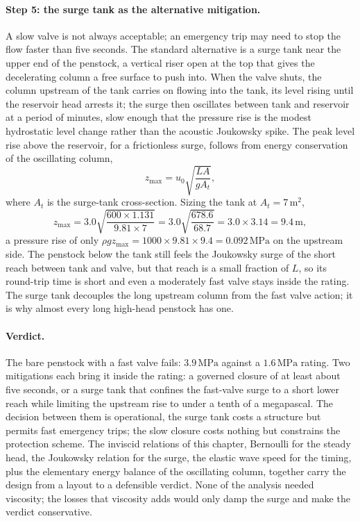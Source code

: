 \paragraph{Step 5: the surge tank as the alternative mitigation.} A
slow valve is not always acceptable; an emergency trip may need to
stop the flow faster than five seconds. The standard alternative is a
surge tank near the upper end of the penstock, a vertical riser open
at the top that gives the decelerating column a free surface to push
into. When the valve shuts, the column upstream of the tank carries
on flowing into the tank, its level rising until the reservoir head
arrests it; the surge then oscillates between tank and reservoir at a
period of minutes, slow enough that the pressure rise is the modest
hydrostatic level change rather than the acoustic Joukowsky spike. The
peak level rise above the reservoir, for a frictionless surge,
follows from energy conservation of the oscillating column,
\[
z_\text{max} = u_0 \sqrt{\frac{L A}{g A_t}},
\]
where $A_t$ is the surge-tank cross-section. Sizing the tank at
$A_t = 7\,\si{\meter}^2$,
\[
z_\text{max} = 3.0\sqrt{\frac{600\times 1.131}{9.81\times 7}}
= 3.0\sqrt{\frac{678.6}{68.7}} = 3.0\times 3.14
= 9.4\,\si{\meter},
\]
a pressure rise of only $\rho g z_\text{max} = 1000\times 9.81\times
9.4 = 0.092\,\text{MPa}$ on the upstream side. The penstock below the
tank still feels the Joukowsky surge of the short reach between tank
and valve, but that reach is a small fraction of $L$, so its
round-trip time is short and even a moderately fast valve stays inside
the rating. The surge tank decouples the long upstream column from the
fast valve action; it is why almost every long high-head penstock has
one.

\paragraph{Verdict.} The bare penstock with a fast valve fails:
$3.9\,\text{MPa}$ against a $1.6\,\text{MPa}$ rating. Two mitigations
each bring it inside the rating: a governed closure of at least about
five seconds, or a surge tank that confines the fast-valve surge to a
short lower reach while limiting the upstream rise to under a tenth of
a megapascal. The decision between them is operational, the surge tank
costs a structure but permits fast emergency trips; the slow closure
costs nothing but constrains the protection scheme. The inviscid
relations of this chapter, Bernoulli for the steady head, the
Joukowsky relation for the surge, the elastic wave speed for the
timing, plus the elementary energy balance of the oscillating column,
together carry the design from a layout to a defensible verdict. None
of the analysis needed viscosity; the losses that viscosity adds
would only damp the surge and make the verdict conservative.

